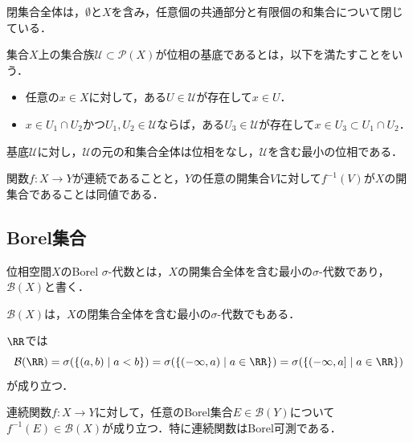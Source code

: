 \begin{proposition}
    閉集合全体は，$\emptyset$と$X$を含み，任意個の共通部分と有限個の和集合について閉じている．
\end{proposition}

\begin{definition}
    集合$X$上の集合族$\mathcal U \subset \mathcal P(X)$が位相の基底であるとは，以下を満たすことをいう．
    \begin{itemize}
        \item 任意の$x \in X$に対して，ある$U \in \mathcal U$が存在して$x \in U$．
        \item $x \in U_1 \cap U_2$かつ$U_1,U_2 \in \mathcal U$ならば，ある$U_3 \in \mathcal U$が存在して$x \in U_3 \subset U_1 \cap U_2$．
    \end{itemize}
\end{definition}

\begin{proposition}
    基底$\mathcal U$に対し，$\mathcal U$の元の和集合全体は位相をなし，$\mathcal U$を含む最小の位相である．
\end{proposition}

\begin{proposition}
    関数$f : X \to Y$が連続であることと，$Y$の任意の開集合$V$に対して$f^{-1}(V)$が$X$の開集合であることは同値である．
\end{proposition}

\subsection{Borel集合}

\begin{definition}
    位相空間$X$のBorel $\sigma$-代数とは，$X$の開集合全体を含む最小の$\sigma$-代数であり，$\mathcal B(X)$と書く．
\end{definition}

\begin{proposition}
    $\mathcal B(X)$は，$X$の閉集合全体を含む最小の$\sigma$-代数でもある．
\end{proposition}

\begin{proposition}
    $\RR$では
    \[
    \mathcal B(\RR)
    = \sigma(\{(a,b) \mid a<b\})
    = \sigma(\{(-\infty,a) \mid a \in \RR\})
    = \sigma(\{(-\infty,a] \mid a \in \RR\})
    \]
    が成り立つ．
\end{proposition}

\begin{proposition}
    連続関数$f : X \to Y$に対して，任意のBorel集合$E \in \mathcal B(Y)$について$f^{-1}(E) \in \mathcal B(X)$が成り立つ．特に連続関数はBorel可測である．
\end{proposition}

